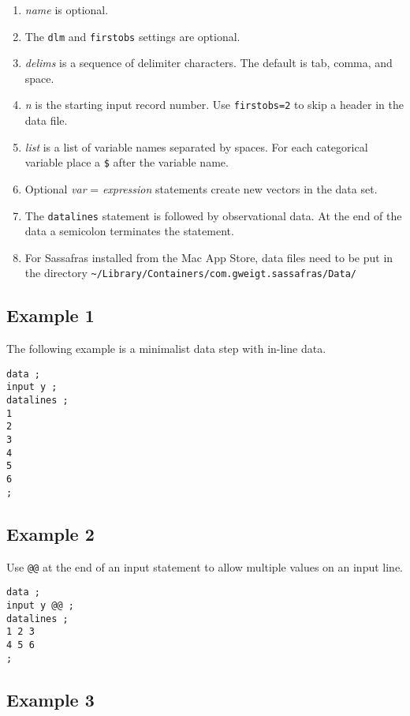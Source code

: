 \documentclass[12pt]{article}
\begin{document}
\begin{enumerate}
\item
{\it name} is optional.
\item
The {\tt dlm} and {\tt firstobs} settings are optional.
\item
{\it delims} is a sequence of delimiter characters.
The default is tab, comma, and space.
\item
{\it n} is the starting input record number.
Use {\tt firstobs=2} to skip a header in the data file.
\item
{\it list} is a list of variable names separated by spaces.
For each categorical variable place a {\tt\$} after the variable name.
\item
Optional {\it var} = {\it expression} statements
create new vectors in the data set.
\item
The {\tt datalines} statement is followed by observational data.
At the end of the data a semicolon terminates the statement.
\item
For Sassafras installed from the Mac App Store,
data files need to be put in the directory
{\scriptsize\verb$~/Library/Containers/com.gweigt.sassafras/Data/$}
\end{enumerate}

\subsection*{Example 1}

The following example is a minimalist data step with in-line data.

{\scriptsize\begin{verbatim}
data ;
input y ;
datalines ;
1
2
3
4
5
6
;
\end{verbatim}}

\subsection*{Example 2}

Use \verb$@@$ at the end of an input statement to allow multiple
values on an input line.

{\scriptsize\begin{verbatim}
data ;
input y @@ ;
datalines ;
1 2 3
4 5 6
;
\end{verbatim}}

\subsection*{Example 3}
\end{document}
